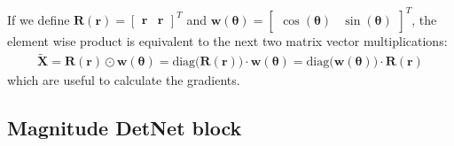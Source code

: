 If we define $\bm R(\bm{r})= \begin{bmatrix}\bm{r}&\bm r\end{bmatrix}^T$ and $\bm w(\bm\theta)=\begin{bmatrix}\cos(\bm{\theta})&\sin(\bm{\theta})\end{bmatrix}^T$, the element wise product is equivalent to the next two matrix vector multiplications:
\begin{align}
	\bm\tilde{X}=\bm R(\bm{r})\odot\bm w(\bm\theta)
	=\text{diag}\bigl(\bm R(\bm{r})\bigr)\cdot \bm w(\bm\theta)
	=\text{diag}\bigl(\bm w(\bm\theta)\bigr)\cdot\bm R(\bm{r})
\end{align}
which are useful to calculate the gradients.


\subsection{Magnitude DetNet block}

